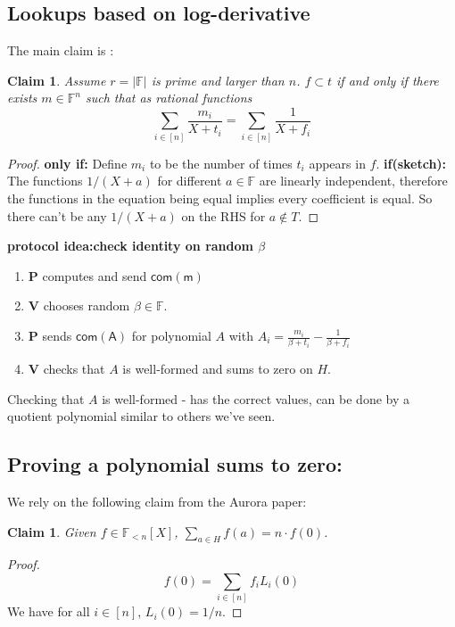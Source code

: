 \documentclass[11pt]{article} %
\newcommand{\F}{\ensuremath{\mathbb F}\xspace}
\newcommand{\com}[1]{\ensuremath{\mathsf{com(#1)}}\xspace}
\newcommand{\prv}{\ensuremath{\mathsf{\mathbf{P}}}\xspace}
\newcommand{\ver}{\ensuremath{\mathsf{\mathbf{V}}}\xspace}
\newcommand{\polysofdeg}[1]{\ensuremath{\F_{< #1}[X]}\xspace}
\newcommand{\sumi}[1]{\sum_{i\in[#1]}}
\newtheorem{claim}[lemma]{Claim}
\begin{document}
\subsection{Lookups based on log-derivative}

The main claim is :

\begin{claim}
Assume $r=|\F|$ is prime and larger than $n$.
 $f\subset t$ if and only if there exists $m\in \F^n$ such that as rational functions
 \[\sum_{i\in [n]}\frac{m_i}{X+t_i}=\sumi{n}\frac{1}{X+f_i}\]
\end{claim}
\begin{proof}
 \textbf{only if:} Define $m_i$ to be the number of times $t_i$ appears in $f$.
 \textbf{if(sketch):} The functions $1/(X+a)$ for different $a\in \F$ are linearly independent,
 therefore the functions in the equation being equal implies every coefficient is equal.
 So there can't be any $1/(X+a)$ on the RHS for $a\notin T$.
\end{proof}


\textbf{protocol idea:check identity on random $\beta$}
\begin{enumerate}
 \item \prv computes and send \com{m}
 \item \ver chooses random $\beta\in \F$.
 \item \prv sends \com{A} for polynomial $A$ with $A_i=\frac{m_i}{\beta+t_i}-\frac{1}{\beta+f_i}$
 \item \ver checks that $A$ is well-formed and sums to zero on $H$.
\end{enumerate}

Checking that $A$ is well-formed - has the correct values, can be done by a quotient polynomial similar to others we've seen.

\subsection{Proving a polynomial sums to zero:}
We rely on the following claim from the Aurora paper:
\begin{claim}
 Given $f\in \polysofdeg{n}$,
 $\sum_{a\in H} f(a) = n\cdot f(0)$.
\end{claim}
\begin{proof}
 \[f(0)=\sumi{n}f_i L_i(0)\]
 We have for all $i\in [n]$, $L_i(0)=1/n$.
\end{proof}
\end{document}
